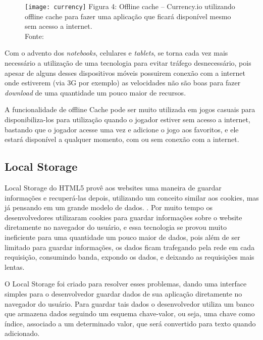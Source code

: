 \begin{figure}[H]
  \centering
	\texttt{[image: currency]}
	\footnotesize\hspace{8\baselineskip}
	Figura 4: Offline cache {--} Currency.io utilizando offline cache para
	fazer uma aplicação que ficará disponível mesmo sem acesso a internet. \\
	Fonte: 
  \label{img:currency}
\end{figure}

Com o advento dos \textit{notebooks}, celulares e \textit{tablets},
se torna cada vez mais necessário a utilização de uma tecnologia para
evitar tráfego desnecessário, pois apesar
de alguns desses dispositivos móveis possuirem conexão com a internet
onde estiverem (via 3G por exemplo) as velocidades não são
boas para fazer \textit{download} de uma quantidade um pouco maior de
recursos.

A funcionalidade de offline Cache pode ser muito utilizada em jogos casuais para
disponibiliza-los para utilização quando o jogador estiver sem acesso
a internet, bastando que o jogador acesse uma vez e adicione o jogo aos favoritos,
e ele estará disponível a qualquer momento, com ou sem conexão com a
internet.


\subsection{Local Storage}

Local Storage do HTML5 provê aos websites uma maneira de guardar
informações e recuperá-las depois, utilizando um conceito similar aos
cookies, mas já pensando em um grande modelo de dados. \cite{pilgrim2010html5}.
Por muito tempo os desenvolvedores utilizaram cookies para guardar
informações sobre o website diretamente no navegador do usuário, e
essa tecnologia se provou muito ineficiente para uma quantidade um
pouco maior de dados, pois além de ser limitado para guardar informações,
os dados ficam trafegando pela rede em cada requisição, consumindo
banda, expondo os dados, e deixando as requisições mais lentas.

O Local Storage foi criado para resolver esses problemas, dando uma
interface simples para o desenvolvedor guardar dados de sua
aplicação diretamente no navegador do usuário. Para guardar tais dados
o desenvolvedor utiliza um banco que armazena dados seguindo um
esquema chave-valor, ou seja, uma chave como índice, associado a um
determinado valor, que será convertido para texto quando adicionado.

